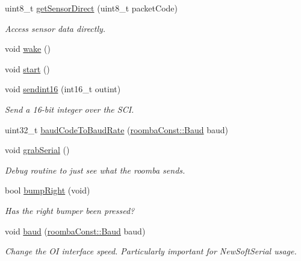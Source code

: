 \begin{DoxyCompactItemize}
uint8\_\-t \hyperlink{class_arduino_roomba_a89d39a2383fa4b668b2090a6184b70d7}{getSensorDirect} (uint8\_\-t packetCode)
\begin{DoxyCompactList}\small\item\em Access sensor data directly. \item\end{DoxyCompactList}\item 
void \hyperlink{class_arduino_roomba_a10f21f4adec3dda853deeab78d31aa5e}{wake} ()
\item 
void \hyperlink{class_arduino_roomba_a6d5b8f94e27b55bd3a4e63590cf336e0}{start} ()
\item 
void \hyperlink{class_arduino_roomba_a197b59263c28d18d9cb237d43b8cbfbb}{sendint16} (int16\_\-t outint)
\begin{DoxyCompactList}\small\item\em Send a 16-\/bit integer over the SCI. \item\end{DoxyCompactList}\item 
uint32\_\-t \hyperlink{class_arduino_roomba_ab69e5496dcb1cb782f85fd61fb0e5e14}{baudCodeToBaudRate} (\hyperlink{namespaceroomba_const_ad1b59bdcff436a657b39206dffaf5caa}{roombaConst::Baud} baud)
\item 
void \hyperlink{class_arduino_roomba_a7e24f9f126babedce4a00f4b925b9821}{grabSerial} ()
\begin{DoxyCompactList}\small\item\em Debug routine to just see what the roomba sends. \item\end{DoxyCompactList}\item 
bool \hyperlink{class_arduino_roomba_aed598e25f1840e3bc173ca24dc4f2773}{bumpRight} (void)
\begin{DoxyCompactList}\small\item\em Has the right bumper been pressed? \item\end{DoxyCompactList}\item 
void \hyperlink{class_arduino_roomba_aadbbdc1dd1f0538e48bc21fa8d6467ae}{baud} (\hyperlink{namespaceroomba_const_ad1b59bdcff436a657b39206dffaf5caa}{roombaConst::Baud} baud)
\begin{DoxyCompactList}\small\item\em Change the OI interface speed. Particularly important for NewSoftSerial usage. \item\end{DoxyCompactList}\item 

\end{DoxyCompactItemize}
